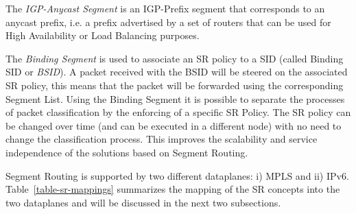 The \textit{IGP-Anycast Segment} is an IGP-Prefix segment that corresponds to an anycast prefix, i.e. a prefix advertised by a set of routers that can be used for High Availability or Load Balancing purposes. 

The \textit{Binding Segment} is used to associate an SR policy to a SID (called Binding SID or \textit{BSID}). A packet received with the BSID will be steered on the associated SR policy, this means that the packet will be forwarded using the corresponding Segment List. Using the Binding Segment it is possible to separate the processes of packet classification by the enforcing of a specific SR Policy. The SR policy can be changed over time (and can be executed in a different node) with no need to change the classification process. This improves the scalability and service independence of the solutions based on Segment Routing.

Segment Routing is supported by two different dataplanes: i) MPLS and ii) IPv6. Table~\ref{table-sr-mappings} summarizes the mapping of the SR concepts into the two dataplanes and will be discussed in the next two subsections. 

